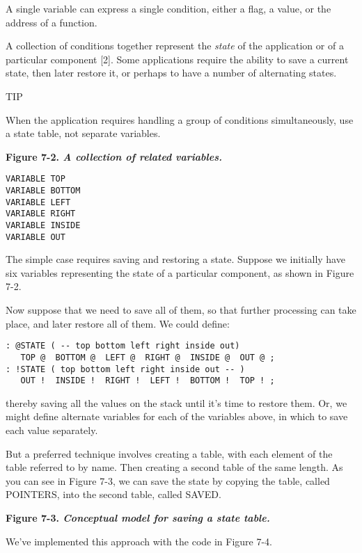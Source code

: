 A single variable can express a single condition, either a flag, a value, or
the address of a function.

A collection of conditions together represent the \emph{state} of the
application or of a particular component [2]. Some applications require the
ability to save a current state, then later restore it, or perhaps to have a
number of alternating states.

TIP

When the application requires handling a group of conditions
simultaneously, use a state table, not separate variables.

\bf{Figure 7-2.} \emph{A collection of related variables.}

\begin{verbatim}
VARIABLE TOP
VARIABLE BOTTOM
VARIABLE LEFT
VARIABLE RIGHT
VARIABLE INSIDE
VARIABLE OUT
\end{verbatim}

The simple case requires saving and restoring a state. Suppose we initially
have six variables representing the state of a particular component, as
shown in Figure 7-2.

Now suppose that we need to save all of them, so that further processing
can take place, and later restore all of them. We could define:

\begin{verbatim}
: @STATE ( -- top bottom left right inside out)
   TOP @  BOTTOM @  LEFT @  RIGHT @  INSIDE @  OUT @ ;
: !STATE ( top bottom left right inside out -- )
   OUT !  INSIDE !  RIGHT !  LEFT !  BOTTOM !  TOP ! ;
\end{verbatim}

thereby saving all the values on the stack until it's time to restore them.
Or, we might define alternate variables for each of the variables above, in
which to save each value separately.

But a preferred technique involves creating a table, with each
element of the table referred to by name. Then creating a second table of
the same length. As you can see in Figure 7-3, we can save the state by
copying the table, called POINTERS, into the second table, called
SAVED.

\bf{Figure 7-3.} \emph{Conceptual model for saving a state table.}


We've implemented this approach with the code in Figure 7-4.

